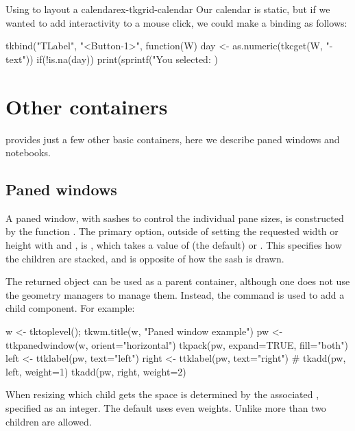 \begin{example}{Using  to layout a calendar}{ex-tkgrid-calendar}
Our calendar is static, but if we wanted to add interactivity to a
mouse click, we could make a binding as follows:
  
\begin{Schunk}
\begin{Sinput}
 tkbind("TLabel", "<Button-1>", function(W) {
   day <- as.numeric(tkcget(W, "-text"))
   if(!is.na(day))
     print(sprintf("You selected: %
 })
\end{Sinput}
\end{Schunk}


\end{example}

\section{Other containers}
\label{sec:tcltk:other-containers}
\TK\/ provides just a few other basic containers, here we describe paned windows and notebooks.

\subsection{Paned windows}
\label{sec:tcltk:paned-windows}

A paned window, with sashes to control the individual pane sizes, is constructed by the function
. The primary option, outside of setting
the requested width or height with  and
, is ,
which takes a value of  (the default) or
. This specifies how the children are stacked, and
is opposite of how the sash is drawn.

The returned object can be used as a parent container, although one
does not use the geometry managers to manage them. Instead, the
 command is used to add a child component. For example:
\begin{Schunk}
\begin{Sinput}
 w <- tktoplevel(); tkwm.title(w, "Paned window example")
 pw <- ttkpanedwindow(w, orient="horizontal")
 tkpack(pw, expand=TRUE, fill="both")
 left <- ttklabel(pw, text="left")
 right <- ttklabel(pw, text="right")
 #
 tkadd(pw, left, weight=1)
 tkadd(pw, right, weight=2)
\end{Sinput}
\end{Schunk}
%
When resizing which child gets the space is determined by the
associated , specified as an integer. The default uses
even weights.  Unlike \GTK\/ more than two children are allowed.

